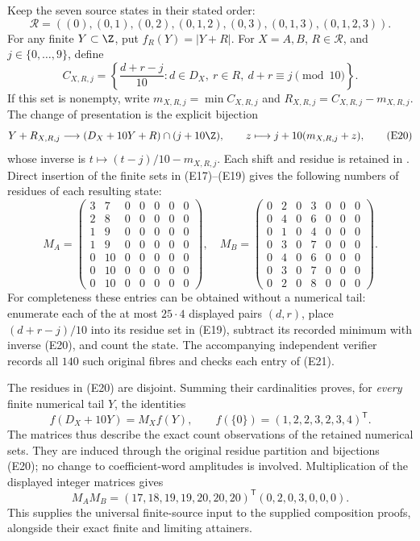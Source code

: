 \documentclass[11pt,a4paper]{article}
\begin{document}
Keep the seven source states in their stated order:
\[
 \mathcal R=((0),(0,1),(0,2),(0,1,2),(0,3),(0,1,3),(0,1,2,3)).
 \tag{E18}
\]
For any finite \(Y\subset\Z\), put \(f_R(Y)=|Y+R|\).  For
\(X=A,B\), \(R\in\mathcal R\), and \(j\in\{0,\ldots,9\}\), define
\[
 C_{X,R,j}
  =\left\{\frac{d+r-j}{10}:
        d\in D_X,\ r\in R,\ d+r\equiv j\pmod {10}\right\}.
 \tag{E19}
\]
If this set is nonempty, write \(m_{X,R,j}=\min C_{X,R,j}\) and
\(R_{X,R,j}=C_{X,R,j}-m_{X,R,j}\).
The change of presentation is the explicit bijection
\[
 Y+R_{X,R,j}\longrightarrow
 (D_X+10Y+R)\cap(j+10\Z),\qquad
 z\longmapsto j+10(m_{X,R,j}+z),
 \tag{E20}
\]
whose inverse is \(t\mapsto(t-j)/10-m_{X,R,j}\).  Each shift and
residue is retained in .
Direct insertion of the finite sets in (E17)--(E19) gives the following
numbers of residues of each resulting state:
\[
 M_A=\begin{pmatrix}
3&7&0&0&0&0&0\\2&8&0&0&0&0&0\\1&9&0&0&0&0&0\\
1&9&0&0&0&0&0\\0&10&0&0&0&0&0\\0&10&0&0&0&0&0\\
0&10&0&0&0&0&0
\end{pmatrix},
\quad
 M_B=\begin{pmatrix}
0&2&0&3&0&0&0\\0&4&0&6&0&0&0\\0&1&0&4&0&0&0\\
0&3&0&7&0&0&0\\0&4&0&6&0&0&0\\0&3&0&7&0&0&0\\
0&2&0&8&0&0&0
\end{pmatrix}.
 \tag{E21}
\]
For completeness these entries can be obtained without a numerical tail:
enumerate each of the at most \(25\cdot4\) displayed pairs \((d,r)\),
place \((d+r-j)/10\) into its residue set in (E19), subtract its recorded
minimum with inverse (E20), and count the state.  The accompanying
independent verifier records all \(140\) such original fibres and
checks each entry of (E21).

The residues in (E20) are disjoint.  Summing their cardinalities proves,
for \emph{every} finite numerical tail \(Y\), the identities
\[
 f(D_X+10Y)=M_Xf(Y),\qquad
 f(\{0\})=(1,2,2,3,2,3,4)^{\mathsf T}.
 \tag{E22}
\]
The matrices thus describe the exact count observations of the retained
numerical sets.  They are induced through the original residue partition
and bijections (E20); no change to coefficient-word amplitudes is involved.
Multiplication of the displayed integer matrices gives
\[
 M_AM_B=(17,18,19,19,20,20,20)^{\mathsf T}(0,2,0,3,0,0,0).
 \tag{E23}
\]
This supplies the universal finite-source input to the supplied
composition proofs, alongside their exact finite and limiting attainers.
\end{document}
